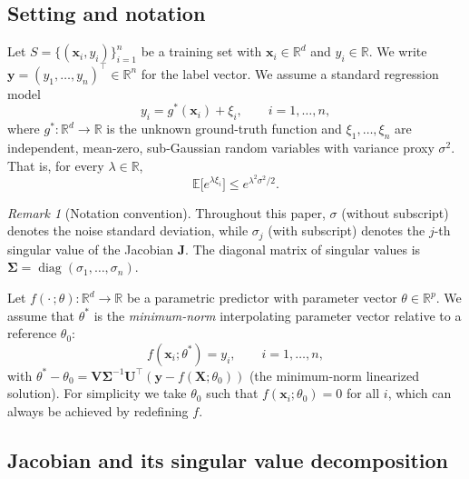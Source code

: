 \documentclass[12pt]{amsart}
\theoremstyle{definition}
\theoremstyle{remark}
\newtheorem{remark}[theorem]{Remark}
\DeclareMathOperator{\diag}{diag}
\newcommand{\R}{\mathbb{R}}
\newcommand{\E}{\mathbb{E}}
\newcommand{\bx}{\mathbf{x}}
\newcommand{\bX}{\mathbf{X}}
\newcommand{\bJ}{\mathbf{J}}
\newcommand{\bU}{\mathbf{U}}
\newcommand{\bV}{\mathbf{V}}
\begin{document}
\subsection{Setting and notation}

Let $S = \{(\bx_{i}, y_{i})\}_{i=1}^{n}$ be a training set with
$\bx_{i} \in \R^{d}$ and $y_{i} \in \R$.  We write
$\mathbf{y} = (y_{1}, \ldots, y_{n})^{\top} \in \R^{n}$ for the label vector.
We assume a standard regression model
\begin{equation}\label{eq:data-model}
  y_{i} = g^{*}(\bx_{i}) + \xi_{i}, \qquad i = 1, \ldots, n,
\end{equation}
where $g^{*}\colon \R^{d} \to \R$ is the unknown ground-truth function and
$\xi_{1}, \ldots, \xi_{n}$ are independent, mean-zero, sub-Gaussian random
variables with variance proxy $\sigma^{2}$.  That is, for every
$\lambda \in \R$,
\begin{equation}\label{eq:sub-gaussian}
  \E\bigl[e^{\lambda \xi_{i}}\bigr] \leq e^{\lambda^{2}\sigma^{2}/2}.
\end{equation}

\begin{remark}[Notation convention]\label{rem:notation}
Throughout this paper, $\sigma$ (without subscript) denotes the noise standard
deviation, while $\sigma_{j}$ (with subscript) denotes the $j$-th singular value
of the Jacobian $\bJ$.  The diagonal matrix of singular values is
$\boldsymbol{\Sigma} = \diag(\sigma_{1}, \ldots, \sigma_{n})$.
\end{remark}

Let $f(\cdot\,; \theta)\colon \R^{d} \to \R$ be a parametric predictor with
parameter vector $\theta \in \R^{p}$.  We assume that $\theta^{*}$ is the \emph{minimum-norm} interpolating
parameter vector relative to a reference $\theta_{0}$:
\begin{equation}\label{eq:interpolation}
  f(\bx_{i}; \theta^{*}) = y_{i}, \qquad i = 1, \ldots, n,
\end{equation}
with $\theta^{*} - \theta_{0} = \bV\boldsymbol{\Sigma}^{-1}\bU^{\top}
(\mathbf{y} - f(\bX; \theta_{0}))$ (the minimum-norm linearized solution).
For simplicity we take $\theta_{0}$ such that $f(\bx_{i}; \theta_{0}) = 0$
for all $i$, which can always be achieved by redefining $f$.

\subsection{Jacobian and its singular value decomposition}
\end{document}
